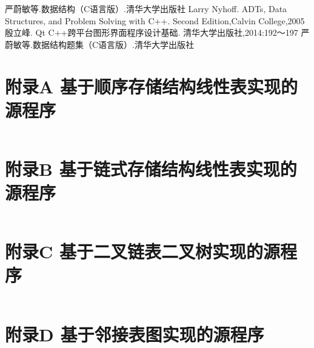 \documentclass[supercite]{Experimental_Report}
\theoremstyle{definition}
\begin{document}
\nocite{*} %

\begin{thebibliography}{}
严蔚敏等.数据结构（C语言版）.清华大学出版社
Larry Nyhoff. ADTs, Data Structures, and Problem Solving with C++.  Second Edition,Calvin College,2005
殷立峰. Qt C++跨平台图形界面程序设计基础. 清华大学出版社,2014:192～197
严蔚敏等.数据结构题集（C语言版）.清华大学出版社
\end{thebibliography}

\section{附录A 基于顺序存储结构线性表实现的源程序}

\begin{lstlisting}[language=c]

\end{lstlisting}

\newpage
\section{附录B 基于链式存储结构线性表实现的源程序}

\begin{lstlisting}[language=c]

\end{lstlisting}

\newpage
\section{附录C 基于二叉链表二叉树实现的源程序}

\begin{lstlisting}[language=c]

\end{lstlisting}

\newpage
\section{附录D 基于邻接表图实现的源程序}
\begin{lstlisting}[language=c]

\end{lstlisting}
\end{document}
